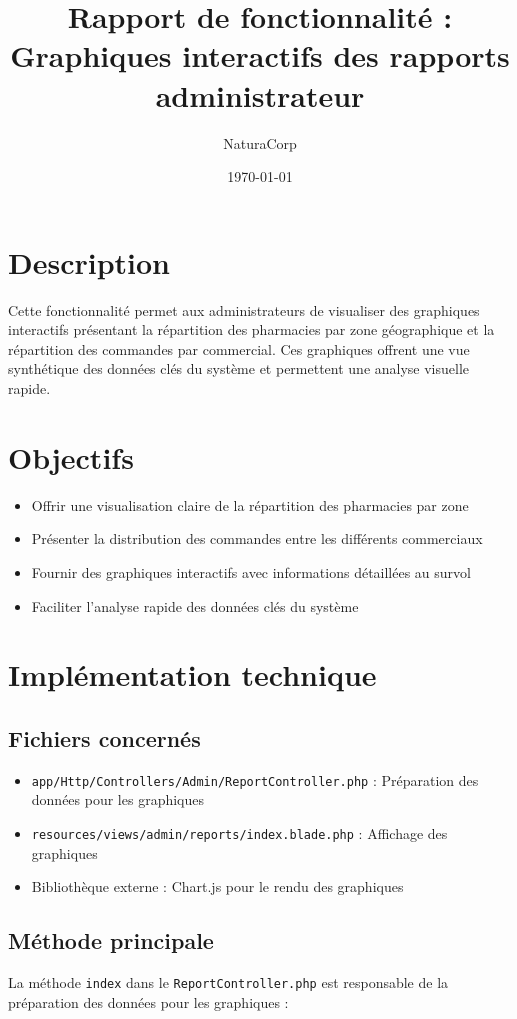 \documentclass[12pt,a4paper]{article}
\title{Rapport de fonctionnalité : Graphiques interactifs des rapports administrateur}
\author{NaturaCorp}
\date{\today}
\begin{document}
\maketitle

\section{Description}
Cette fonctionnalité permet aux administrateurs de visualiser des graphiques interactifs présentant la répartition des pharmacies par zone géographique et la répartition des commandes par commercial. Ces graphiques offrent une vue synthétique des données clés du système et permettent une analyse visuelle rapide.

\section{Objectifs}
\begin{itemize}
    \item Offrir une visualisation claire de la répartition des pharmacies par zone
    \item Présenter la distribution des commandes entre les différents commerciaux
    \item Fournir des graphiques interactifs avec informations détaillées au survol
    \item Faciliter l'analyse rapide des données clés du système
\end{itemize}

\section{Implémentation technique}

\subsection{Fichiers concernés}
\begin{itemize}
    \item \texttt{app/Http/Controllers/Admin/ReportController.php} : Préparation des données pour les graphiques
    \item \texttt{resources/views/admin/reports/index.blade.php} : Affichage des graphiques
    \item Bibliothèque externe : Chart.js pour le rendu des graphiques
\end{itemize}

\subsection{Méthode principale}
La méthode \texttt{index} dans le \texttt{ReportController.php} est responsable de la préparation des données pour les graphiques :
\end{document}
